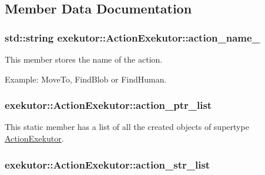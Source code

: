 \subsection{\-Member \-Data \-Documentation}
\hypertarget{classexekutor_1_1ActionExekutor_ad0ab1bb7a2575962ee5fc9e2150c5d50}{
\subsubsection[{action\-\_\-name\-\_\-}]{\setlength{\rightskip}{0pt plus 5cm}std\-::string {\bf exekutor\-::\-Action\-Exekutor\-::action\-\_\-name\-\_\-}}}\label{classexekutor_1_1ActionExekutor_ad0ab1bb7a2575962ee5fc9e2150c5d50}


\-This member stores the name of the action. 

\-Example\-: \-Move\-To, \-Find\-Blob or \-Find\-Human. \hypertarget{classexekutor_1_1ActionExekutor_a73c4f2607b0725f5b201cf501cb42578}{
\subsubsection[{action\-\_\-ptr\-\_\-list}]{ {\bf exekutor\-::\-Action\-Exekutor\-::action\-\_\-ptr\-\_\-list}}}\label{classexekutor_1_1ActionExekutor_a73c4f2607b0725f5b201cf501cb42578}


\-This static member has a list of all the created objects of supertype \hyperlink{classexekutor_1_1ActionExekutor}{\-Action\-Exekutor}. 

\hypertarget{classexekutor_1_1ActionExekutor_a0dc39a7a2a3a67d2bdd366f9e6e682a2}{
\subsubsection[{action\-\_\-str\-\_\-list}]{ {\bf exekutor\-::\-Action\-Exekutor\-::action\-\_\-str\-\_\-list}}}\label{classexekutor_1_1ActionExekutor_a0dc39a7a2a3a67d2bdd366f9e6e682a2}


